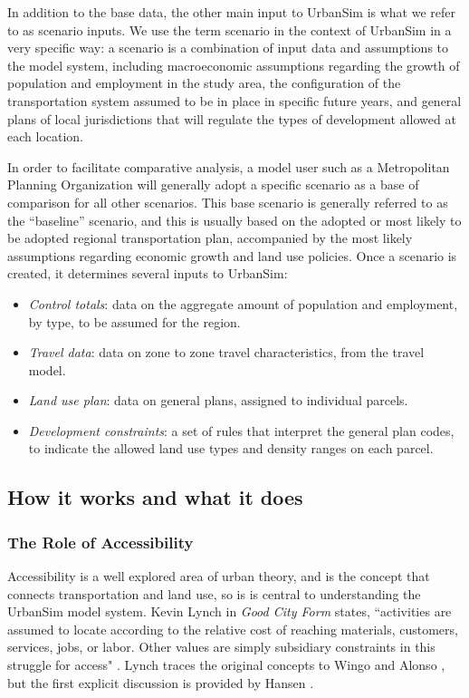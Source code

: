 In addition to the base data, the other main input to UrbanSim is what we refer to as scenario inputs. We use the term scenario in the context of UrbanSim in a very specific way: a scenario is a combination of input data and assumptions to the model system, including macroeconomic assumptions regarding the growth of population and employment in the study area, the configuration of the transportation system assumed to be in place in specific future years, and general plans of local jurisdictions that will regulate the types of development allowed at each location.

In order to facilitate comparative analysis, a model user such as a Metropolitan Planning Organization will generally adopt a specific scenario as a base of comparison for all other scenarios. This base scenario is generally referred to as the \enquote{baseline} scenario, and this is usually based on the adopted or most likely to be adopted regional transportation plan, accompanied by the most likely assumptions regarding economic growth and land use policies. Once a scenario is created, it determines several inputs to UrbanSim:

\begin{itemize}
    \item \textit{Control totals}: data on the aggregate amount of population and employment, by type, to be assumed for the region.
    \item \textit{Travel data}: data on zone to zone travel characteristics, from the travel model.
    \item \textit{Land use plan}: data on general plans, assigned to individual parcels.
    \item \textit{Development constraints}: a set of rules that interpret the general plan codes, to indicate the allowed land use types and density ranges on each parcel.
\end{itemize}

\subsection{How it works and what it does}

\subsubsection{The Role of Accessibility}

Accessibility is a well explored area of urban theory, and is the concept that connects transportation and land use, so is is central to understanding the UrbanSim model system.  Kevin Lynch in \textit{Good City Form} states, ``activities are assumed to locate according to the relative cost of reaching materials, customers, services, jobs, or labor.  Other values are simply subsidiary constraints in this struggle for access" \citep{lynch_good_1984}.  Lynch traces the original concepts to Wingo and Alonso \citep{wingo_transportation_1961,alonso_location_1964}, but the first explicit discussion is provided by Hansen \citep{hansen_how_1959}.

